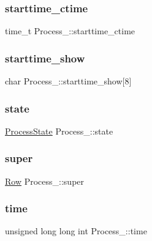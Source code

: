 \subsubsection{\texorpdfstring{starttime\+\_\+ctime}{starttime\_ctime}}
{\footnotesize\ttfamily time\+\_\+t Process\+\_\+\+::starttime\+\_\+ctime}

\mbox{\label{structProcess___a5b1599ab799622878ab248474061d4be}} 
\subsubsection{\texorpdfstring{starttime\+\_\+show}{starttime\_show}}
{\footnotesize\ttfamily char Process\+\_\+\+::starttime\+\_\+show\mbox{[}8\mbox{]}}

\mbox{\label{structProcess___a952ce166b520838a9b53987d1f7b9eea}} 
\subsubsection{\texorpdfstring{state}{state}}
{\footnotesize\ttfamily \hyperlink{Process_8h_a058a4a49f4578136dfcf39a19cd5d2ad}{Process\+State} Process\+\_\+\+::state}

\mbox{\label{structProcess___a09ae30bf69354e5c7b62ba18e99112b9}} 
\subsubsection{\texorpdfstring{super}{super}}
{\footnotesize\ttfamily \hyperlink{Row_8h_a54193344854aa79a97448ca03062e70c}{Row} Process\+\_\+\+::super}

\mbox{\label{structProcess___a450ede65d286d1d1300fcacd1aad3cc9}} 
\subsubsection{\texorpdfstring{time}{time}}
{\footnotesize\ttfamily unsigned long long int Process\+\_\+\+::time}


